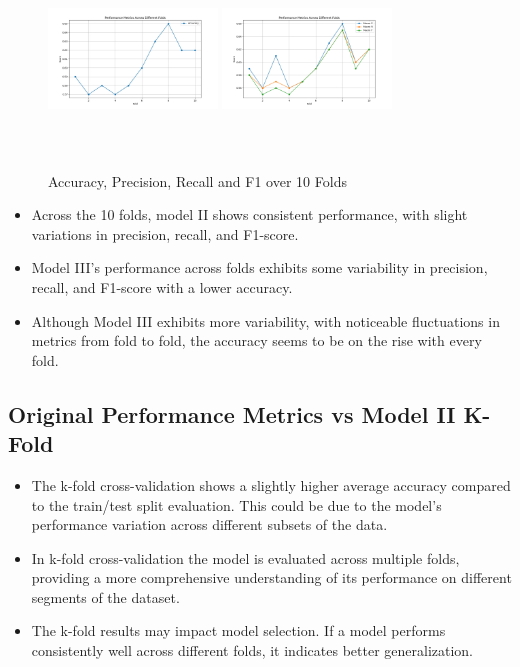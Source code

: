 \begin{figure}[h!]
  \centering

  \includegraphics[width=0.4\textwidth, height=5cm]{resources/3acc-kf.jpeg} \hspace{3em}
  \includegraphics[width=0.4\textwidth, height=5cm]{resources/3perf-kf.png}

  \caption{Accuracy, Precision, Recall and F1 over 10 Folds}
\end{figure}

\begin{itemize}
  \item Across the 10 folds, model II shows consistent performance, with slight variations in precision, recall, and F1-score.
  \item Model III's performance across folds exhibits some variability in precision, recall, and F1-score with a lower accuracy.
  \item Although Model III exhibits more variability, with noticeable fluctuations in metrics from fold to fold, the accuracy seems to be on the rise with every fold.
\end{itemize}

\subsection*{Original Performance Metrics vs Model II K-Fold}
\begin{itemize}
  \item The k-fold cross-validation shows a slightly higher average accuracy compared to the train/test split evaluation. This could be due to the model's performance variation across different subsets of the data.
  \item In k-fold cross-validation the model is evaluated across multiple folds, providing a more comprehensive understanding of its performance on different segments of the dataset.
  \item The k-fold results may impact model selection. If a model performs consistently well across different folds, it indicates better generalization.
\end{itemize}